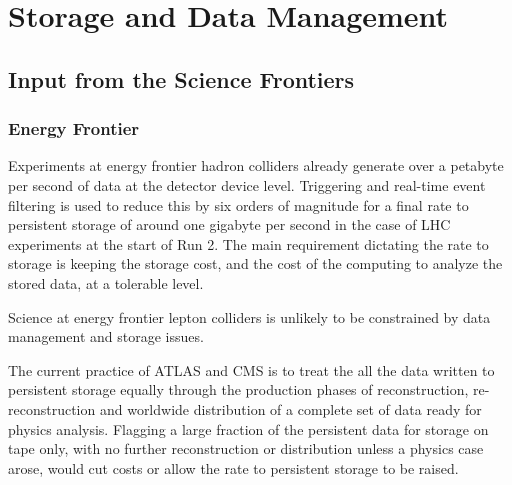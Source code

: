  
\chapter{Storage and Data Management}
\label{chap:mag}


\begin{center}\begin{boldmath}



\end{boldmath}\end{center}


\section{Input from the Science Frontiers}
\label{sec:cpfi5-input}
\subsection{Energy Frontier}
Experiments at energy frontier hadron colliders already generate over a petabyte per 
second of data at the detector device level.  Triggering and real-time event filtering 
is used to reduce this by six orders of magnitude for a final rate to persistent storage 
of around one gigabyte per second in the case of LHC experiments at the start of Run 2.  
The main requirement dictating the rate to storage is keeping the storage cost, and the 
cost of the computing to analyze the stored data, at a tolerable level.

Science at energy frontier lepton colliders is unlikely to be constrained by data 
management and storage issues.

The current practice of ATLAS and CMS is to treat the all the data written to persistent 
storage equally through the production phases of reconstruction, re-reconstruction and 
worldwide distribution of a complete set of data ready for physics analysis.  Flagging 
a large fraction of the persistent data for storage on tape only, with no further 
reconstruction or distribution unless a physics case arose, would cut costs or allow 
the rate to persistent storage to be raised.

